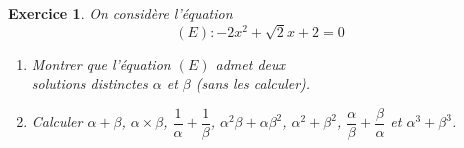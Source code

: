 \documentclass[12pt,a4paper]{article}
\theoremstyle{mystyle}
\newtheorem{exo}{Exercice}
\begin{document}
\begin{multicols*}{2}
\begin{exo}
On considère l'équation \[(E): -2x^{2} + \sqrt{2}x + 2 = 0\]

\begin{enumerate}
    \item Montrer que l'équation \((E)\) admet deux \\ solutions distinctes \(\alpha\) et \(\beta\) (sans les calculer).
    \item Calculer \(\alpha + \beta\), \(\alpha \times \beta\), \(\dfrac{1}{\alpha} + \dfrac{1}{\beta}\), \(\alpha^{2}\beta + \alpha\beta^{2}\), \(\alpha^{2} + \beta^{2}\), \(\dfrac{\alpha}{\beta} + \dfrac{\beta}{\alpha}\) et \(\alpha^{3} + \beta^{3}\).
\end{enumerate}
\end{exo}




























\end{multicols*}
\end{document}
